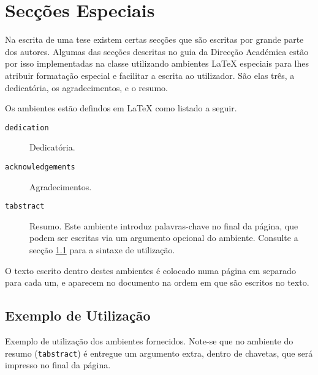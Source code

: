 \documentclass{../ist-thesis}
\begin{document}
\section{Secções Especiais}\label{sec:spec}

Na escrita de uma tese existem certas secções que são escritas por grande parte dos autores. Algumas das secções descritas no guia da Direcção Académica estão por isso implementadas na classe utilizando ambientes\footnotemark{} \LaTeX{} especiais para lhes atribuir formatação especial e facilitar a escrita ao utilizador. São elas três, a dedicatória, os agradecimentos, e o resumo.

Os ambientes estão defindos em \LaTeX{} como listado a seguir.
\begin{description}
	\item [\texttt{dedication}] Dedicatória.
	\item [\texttt{acknowledgements}] Agradecimentos.
	\item [\texttt{tabstract}] Resumo. Este ambiente introduz palavras-chave no final da página, que podem ser escritas via um argumento opcional do ambiente. Consulte a secção \ref{sec:env_example} para a sintaxe de utilização.
\end{description}

O texto escrito dentro destes ambientes é colocado numa página em separado para cada um, e aparecem no documento na ordem em que são escritos no texto.

\subsection{Exemplo de Utilização}\label{sec:env_example}

Exemplo de utilização dos ambientes fornecidos. Note-se que no ambiente do resumo (\texttt{tabstract}) é entregue um argumento extra, dentro de chavetas, que será impresso no final da página.
\end{document}
